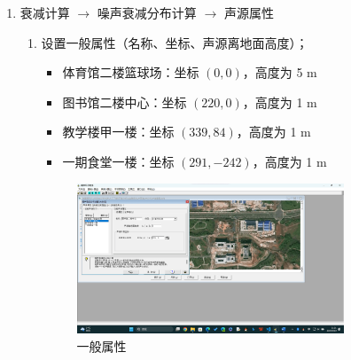 \begin{enumerate}
    \item 衰减计算 $\rightarrow $ 噪声衰减分布计算 $\rightarrow $ 声源属性
    \begin{enumerate}[label=\arabic*)]
        \item 设置一般属性（名称、坐标、声源离地面高度）；
        \begin{itemize}
            \item 体育馆二楼篮球场：坐标 $(0,0)$，高度为 5 m
            \item 图书馆二楼中心：坐标 $(220,0)$，高度为 1 m
            \item 教学楼甲一楼：坐标 $(339,84)$，高度为 1 m
            \item 一期食堂一楼：坐标 $(291,-242)$，高度为 1 m
        \end{itemize}
        \begin{figure}[H]
            \centering
            \includegraphics[width=0.8\textwidth]{figures/acoustic_step2-1.png}
            \caption{一般属性}
        \end{figure}


\end{enumerate}
\end{enumerate}
